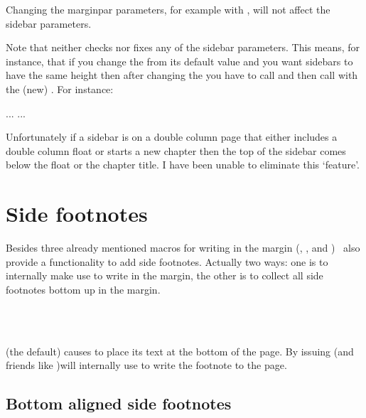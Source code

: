 \documentclass[10pt,a4paper,extrafontsizes]{memoir}
\begin{document}
   Changing the marginpar parameters, for example with \cmd{\setmarginnotes},
will not affect the sidebar parameters.

   Note that \cmd{\checkandfixthelayout} neither checks nor fixes any of
the sidebar parameters. This means, for instance, that if you change the
\lnc{\textheight} from its default value and you want sidebars to have 
the same height then after changing the \lnc{\textheight} you have to 
call \cmd{\checkandfixthelayout}  and then call \cmd{\setsidebars} with
the (new) \lnc{\textheight}. For instance:
\begin{lcode}
...
...
\checkandfixthelayout
{}
\end{lcode}

    Unfortunately if a sidebar is on a double column page that either includes
a double column float or starts a new chapter then the top of the sidebar
comes below the float or the chapter title. I have been unable to eliminate 
this `feature'.


\section{Side footnotes}
\label{sec:side-footnotes}

Besides three already mentioned macros for writing in the margin
(\cmd{\marginpar}, \cmd{\sidepar}, and \cmd{\sidebar}) \theclass\ also
provide a functionality to add side footnotes. Actually two ways: one
is to internally make \cmd{\footnote} use \cmd{\marginpar} to write
in the margin, the other is to collect all side footnotes bottom up in
the margin.
\begin{syntax}
  \cmd{\footnotesatfoot}\\
  \cmd{\footnotesinmargin}\\
\end{syntax}
\cmd{\footnotesatfoot} (the default) causes \cmd{\footnote} to place
its text at the bottom of the page. By issuing 
\cmd{\footnote} (and friends like \cmd{\footnotetext})will internally
use \cmd{\marginpar} to write the footnote to the page.



\subsection{Bottom aligned side footnotes}
\label{sec:bottom-aligned-side}
\end{document}
